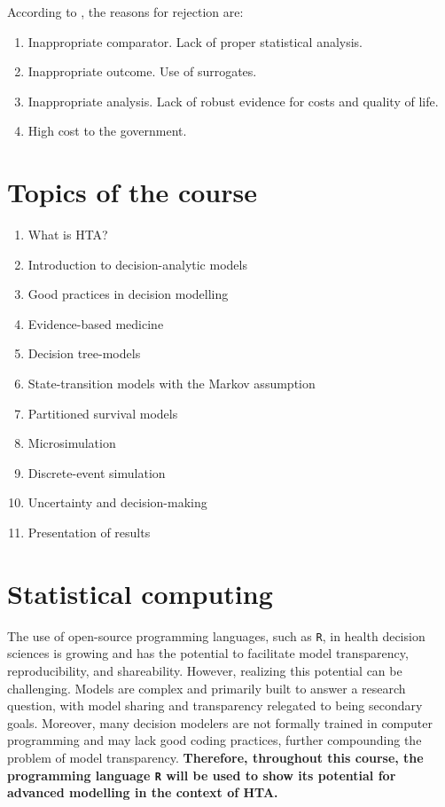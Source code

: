 \documentclass[
]{book}
\providecommand{\tightlist}{%
  \setlength{\itemsep}{0pt}\setlength{\parskip}{0pt}}
\begin{document}
According to \citet{goeree2015health}, the reasons for rejection are:

\begin{enumerate}
\def\labelenumi{\arabic{enumi}.}
\tightlist
\item
  Inappropriate comparator. Lack of proper statistical analysis.
\item
  Inappropriate outcome. Use of surrogates.
\item
  Inappropriate analysis. Lack of robust evidence for costs and quality of life.
\item
  High cost to the government.
\end{enumerate}

\hypertarget{topics-of-the-course}{%
\section*{Topics of the course}\label{topics-of-the-course}}

\begin{enumerate}
\def\labelenumi{\arabic{enumi}.}
\tightlist
\item
  What is HTA?
\item
  Introduction to decision-analytic models
\item
  Good practices in decision modelling
\item
  Evidence-based medicine
\item
  Decision tree-models
\item
  State-transition models with the Markov assumption
\item
  Partitioned survival models
\item
  Microsimulation
\item
  Discrete-event simulation
\item
  Uncertainty and decision-making
\item
  Presentation of results
\end{enumerate}

\hypertarget{statistical-computing}{%
\section*{Statistical computing}\label{statistical-computing}}

The use of open-source programming languages, such as \texttt{R}, in health decision sciences is growing and has the potential to facilitate model transparency, reproducibility, and shareability. However, realizing this potential can be challenging. Models are complex and primarily built to answer a research question, with model sharing and transparency relegated to being secondary goals. Moreover, many decision modelers are not formally trained in computer programming and may lack good coding practices, further compounding the problem of model transparency. \textbf{Therefore, throughout this course, the programming language \texttt{R} will be used to show its potential for advanced modelling in the context of HTA.}
\end{document}
